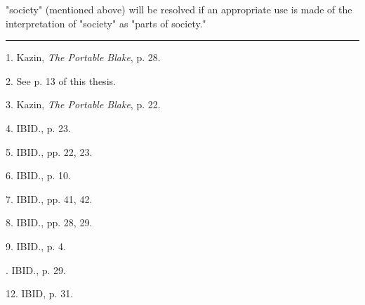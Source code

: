 "society" (mentioned above) will be resolved if an appropriate use is made of the interpretation
of "society" as "parts of society."\linebreak
\null\par
\vspace*{-\baselineskip}
\vspace*{\fill}
\noindent\rule{0.25\textwidth}{0.4pt}\par
1. Kazin, \textit{The Portable Blake}, p. 28.\par
2. See p. 13 of this thesis.\par
3. Kazin, \textit{The Portable Blake}, p. 22.\par
4. IBID., p. 23.\par
5. IBID., pp. 22, 23.\par
6. IBID., p. 10.\par
7. IBID., pp. 41, 42.\par
8. IBID., pp. 28, 29.\par
9. IBID., p. 4.\par
[10, 11]. IBID., p. 29.\par
12. IBID, p. 31.\par

\newpage

